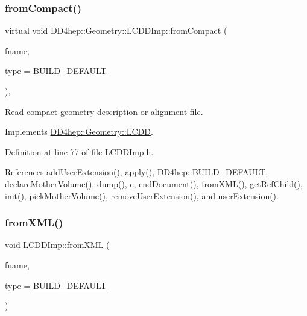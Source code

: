 \subsubsection{\texorpdfstring{from\+Compact()}{fromCompact()}}
{\footnotesize\ttfamily virtual void D\+D4hep\+::\+Geometry\+::\+L\+C\+D\+D\+Imp\+::from\+Compact (\begin{DoxyParamCaption}\item[{const std\+::string \&}]{fname,  }\item[{\hyperlink{namespace_d_d4hep_acafe43ba4537ab6e999e808142965fab}{L\+C\+D\+D\+Build\+Type}}]{type = {\ttfamily \hyperlink{namespace_d_d4hep_acafe43ba4537ab6e999e808142965fabaceac720f961afd2369fcc9f343113a2e}{B\+U\+I\+L\+D\+\_\+\+D\+E\+F\+A\+U\+LT}} }\end{DoxyParamCaption})\hspace{0.3cm}{\ttfamily [inline]}, {\ttfamily [virtual]}}



Read compact geometry description or alignment file. 



Implements \hyperlink{class_d_d4hep_1_1_geometry_1_1_l_c_d_d_abc18ac1b03188da6e4400943eca4bd2e}{D\+D4hep\+::\+Geometry\+::\+L\+C\+DD}.



Definition at line 77 of file L\+C\+D\+D\+Imp.\+h.



References add\+User\+Extension(), apply(), D\+D4hep\+::\+B\+U\+I\+L\+D\+\_\+\+D\+E\+F\+A\+U\+LT, declare\+Mother\+Volume(), dump(), e, end\+Document(), from\+X\+M\+L(), get\+Ref\+Child(), init(), pick\+Mother\+Volume(), remove\+User\+Extension(), and user\+Extension().

\hypertarget{class_d_d4hep_1_1_geometry_1_1_l_c_d_d_imp_ade843dae125e811b1ce48f7bfa2dc0ef}{}\label{class_d_d4hep_1_1_geometry_1_1_l_c_d_d_imp_ade843dae125e811b1ce48f7bfa2dc0ef} 
\subsubsection{\texorpdfstring{from\+X\+M\+L()}{fromXML()}\hspace{0.1cm}{\footnotesize\ttfamily [1/2]}}
{\footnotesize\ttfamily void L\+C\+D\+D\+Imp\+::from\+X\+ML (\begin{DoxyParamCaption}\item[{const std\+::string \&}]{fname,  }\item[{\hyperlink{namespace_d_d4hep_acafe43ba4537ab6e999e808142965fab}{L\+C\+D\+D\+Build\+Type}}]{type = {\ttfamily \hyperlink{namespace_d_d4hep_acafe43ba4537ab6e999e808142965fabaceac720f961afd2369fcc9f343113a2e}{B\+U\+I\+L\+D\+\_\+\+D\+E\+F\+A\+U\+LT}} }\end{DoxyParamCaption})\hspace{0.3cm}{\ttfamily [virtual]}}



